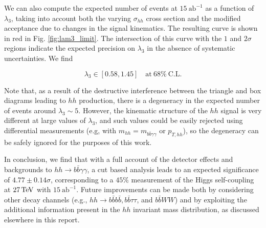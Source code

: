 We can also compute the expected number of events at $15~\text{ab}^{-1}$ as a function of $\lambda_{3}$, taking into account both the varying $\sigma_{hh}$ cross section and the modified acceptance due to changes in the signal kinematics. The resulting curve is shown in red in Fig. \ref{fig:lam3_limit}. The intersection of this curve with the $1$ and $2\sigma$ regions indicate the expected precision on $\lambda_3$ in the absence of systematic uncertainties. We find

\begin{equation}
\lambda_{3} \in \left[ 0.58 ,  1.45 \right] \quad \text{at}~ 68\%~\text{C.L.}
\end{equation}

Note that, as a result of the destructive interference between the triangle and box diagrams leading to $hh$ production, there is a degeneracy in the expected number of events around $\lambda_3 \sim 5$. However, the kinematic structure of the $hh$ signal is very different at large values of $\lambda_3$, and such values could be easily rejected using differential measurements (e.g, with $m_{hh} = m_{b\bar{b}\gamma\gamma}$ or $p_{T,hh}$), so the degeneracy can be safely ignored for the purposes of this work.

In conclusion, we find that with a full account of the detector effects and backgrounds to $hh\rightarrow b\bar{b}\gamma\gamma$, a cut based analysis leads to an expected significance of $4.77 \pm 0.14 \sigma$, corresponding to a $45 \%$ measurement of the Higgs self-coupling at $27\, {\rm TeV}$ with $15~\text{ab}^{-1}$. Future improvements can be made both by considering other decay channels (e.g., $hh\rightarrow b\bar{b}b\bar{b}, b\bar{b}\tau\tau$, and $b\bar{b}WW$) and by exploiting the additional information present in the $hh$ invariant mass distribution, as discussed elsewhere in this report.

